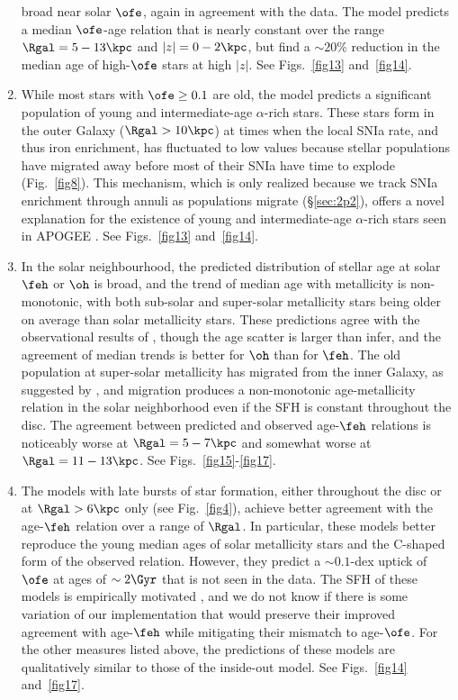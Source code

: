 \begin{enumerate}
  broad near solar $\ofe$, again in agreement with the data.  The model
  predicts a median $\ofe$-age relation that is nearly constant over the
  range $\Rgal=5-13\kpc$ and $|z|=0-2\kpc$, but \cite{Feuillet2019} find
  a $\sim 20\%$ reduction in the median age of high-$\ofe$ stars at high $|z|$.
  See Figs.~\ref{fig13} and~\ref{fig14}.
\item While most stars with $\ofe \geq 0.1$ are old, the model predicts a
  significant population of young and intermediate-age $\alpha$-rich stars.
  These stars form in the outer Galaxy ($\Rgal > 10\kpc$) at times
  when the local SNIa rate, and thus iron enrichment, has fluctuated to low
  values because stellar populations have migrated away before most of their
  SNIa have time to explode (Fig.~\ref{fig8}).  This mechanism, which is
  only realized because we track SNIa enrichment through annuli as 
  populations migrate (\S\ref{sec:2p2}), offers a novel explanation for the
  existence of young and intermediate-age $\alpha$-rich stars seen in
  APOGEE \citep{Chiappini2015,Martig2015,Warfield2021}.  
  See Figs.~\ref{fig13} and~\ref{fig14}.
\item In the solar neighbourhood, the predicted distribution of stellar age
  at solar $\feh$ or $\oh$ is broad, and the trend of median age with 
  metallicity is non-monotonic, with both sub-solar and super-solar metallicity
  stars being older on average than solar metallicity stars.  These 
  predictions agree with the observational results of \cite{Feuillet2019},
  though the age scatter is larger than \cite{Feuillet2019} infer, and
  the agreement of median trends is better for $\oh$ than for $\feh$.
  The old population at super-solar metallicity has migrated from the 
  inner Galaxy, as suggested by \cite{Feuillet2018,Feuillet2019}, and 
  migration produces a non-monotonic age-metallicity relation in the
  solar neighborhood even if the SFH is constant throughout the disc.
  The agreement between predicted and observed age-$\feh$ relations is
  noticeably worse at $\Rgal=5-7\kpc$ and somewhat worse at $\Rgal=11-13\kpc$.
  See Figs.~\ref{fig15}-\ref{fig17}.
\item The models with late bursts of star formation, either throughout the
  disc or at $\Rgal > 6\kpc$ only (see Fig.~\ref{fig4}), achieve better
  agreement with the \cite{Feuillet2019} age-$\feh$ relation over a range
  of $\Rgal$.  In particular, these models better reproduce the young median
  ages of solar metallicity stars and the C-shaped form of the observed
  relation.  However, they predict a $\sim 0.1$-dex uptick of $\ofe$ at
  ages of $\sim 2\Gyr$ that is not seen in the data.  The SFH of these 
  models is empirically motivated \citep{Isern2019,Mor2019}, and we do not
  know if there is some variation of our implementation that would
  preserve their improved agreement with age-$\feh$ while mitigating
  their mismatch to age-$\ofe$.  For the other measures listed above, the
  predictions of these models are qualitatively similar to those of 
  the inside-out model.  See Figs.~\ref{fig14} and~\ref{fig17}.
\end{enumerate}

